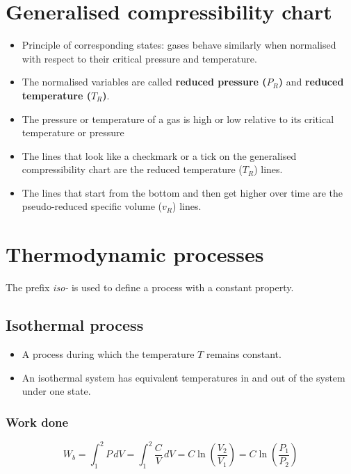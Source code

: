 \documentclass[11pt]{article}
\begin{document}
\section{Generalised compressibility chart}
\label{sec:orgcc2670c}
\begin{itemize}
\item Principle of corresponding states: gases behave similarly when normalised with respect to their critical pressure and temperature.
\item The normalised variables are called \textbf{reduced pressure (\(P_R\))} and \textbf{reduced temperature (\(T_R\))}.
\item The pressure or temperature of a gas is high or low relative to its critical temperature or pressure
\item The lines that look like a checkmark or a tick on the generalised compressibility chart are the reduced temperature (\(T_R\)) lines.
\item The lines that start from the bottom and then get higher over time are the pseudo-reduced specific volume (\(v_R\)) lines.
\end{itemize}

\newpage

\section{Thermodynamic processes}
\label{sec:orgf9e1777}
The prefix \emph{iso-} is used to define a process with a constant property.

\subsection{Isothermal process}
\label{sec:orgc0d3034}
\begin{itemize}
\item A process during which the temperature \(T\) remains constant.
\item An isothermal system has equivalent temperatures in and out of the system under one state.
\end{itemize}

\subsubsection{Work done}
\label{sec:org3eab0bb}
\[W_b = \int_1^2 P \, dV = \int_1^2 \frac{C}{V} \, dV = C \ln \left(\frac{V_2}{V_1} \right) = C \ln \left(\frac{P_1}{P_2} \right)\]
\end{document}
